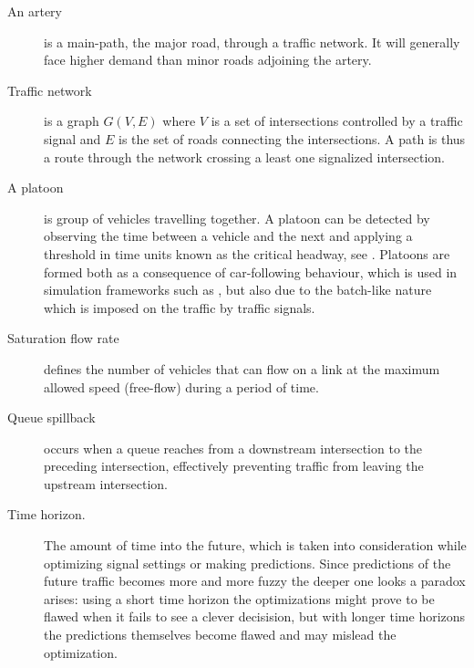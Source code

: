 \begin{description}
\item[An artery] is a main-path, the major road, through a traffic network. It will generally face higher demand than minor roads adjoining the artery.

\item[Traffic network] is a graph $G(V,E)$ where $V$ is a set of intersections controlled by a traffic signal and $E$ is the set of roads connecting the intersections. A path is thus a route through the network crossing a least one signalized intersection.

	\item[A platoon] is group of vehicles travelling together. A platoon can be detected by observing the time between a vehicle and the next and applying a threshold in time units known as the critical headway, see \cite[sct. 2]{25}. 
Platoons are formed both as a consequence of car-following behaviour, which is used in simulation frameworks such as \cite{treiber-2000-62}, but also due to the batch-like nature which is imposed on the traffic by traffic signals.

\item[Saturation flow rate] defines the number of vehicles that can flow on a link at the maximum allowed speed (free-flow) during a period of time.

\item[Queue spillback] occurs when a queue reaches from a downstream intersection to the preceding intersection, effectively preventing traffic from leaving the upstream intersection.

\item[Time horizon.] The amount of time into the future, which is taken into consideration while optimizing signal settings or making predictions. Since predictions of the future traffic becomes more and more fuzzy the deeper one looks a paradox arises: using a short time horizon the optimizations might prove to be flawed when it fails to see a clever decisision, but with longer time horizons the predictions themselves become flawed and may mislead the optimization.

\end{description}
